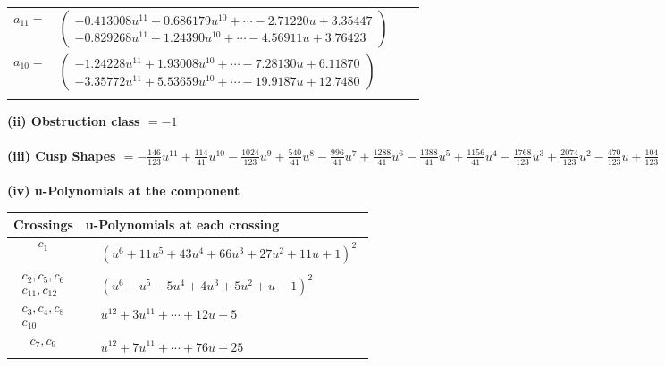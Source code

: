 \documentclass[1p]{elsarticle_modified}
\theoremstyle{definition}
\begin{document}
\begin{tabular}{m{7pt} m{180pt} m{7pt} m{180pt} }
\flushright $a_{11}=$&$\begin{pmatrix}-0.413008 u^{11}+0.686179 u^{10}+\cdots-2.71220 u+3.35447\\-0.829268 u^{11}+1.24390 u^{10}+\cdots-4.56911 u+3.76423\end{pmatrix}$ \\
\flushright $a_{10}=$&$\begin{pmatrix}-1.24228 u^{11}+1.93008 u^{10}+\cdots-7.28130 u+6.11870\\-3.35772 u^{11}+5.53659 u^{10}+\cdots-19.9187 u+12.7480\end{pmatrix}$\\&\end{tabular}
\flushleft \textbf{(ii) Obstruction class $= -1$}\\~\\
\flushleft \textbf{(iii) Cusp Shapes $= -\frac{146}{123} u^{11}+\frac{114}{41} u^{10}-\frac{1024}{123} u^9+\frac{540}{41} u^8-\frac{996}{41} u^7+\frac{1288}{41} u^6-\frac{1388}{41} u^5+\frac{1156}{41} u^4-\frac{1768}{123} u^3+\frac{2074}{123} u^2-\frac{470}{123} u+\frac{104}{123}$}\\~\\
\newpage\renewcommand{\arraystretch}{1}
\flushleft \textbf{(iv) u-Polynomials at the component}\newline \\
\begin{tabular}{m{50pt}|m{274pt}}
Crossings & \hspace{64pt}u-Polynomials at each crossing \\
\hline $$\begin{aligned}c_{1}\end{aligned}$$&$\begin{aligned}
&(u^6+11 u^5+43 u^4+66 u^3+27 u^2+11 u+1)^2
\end{aligned}$\\
\hline $$\begin{aligned}c_{2},c_{5},c_{6}\\c_{11},c_{12}\end{aligned}$$&$\begin{aligned}
&(u^6- u^5-5 u^4+4 u^3+5 u^2+u-1)^2
\end{aligned}$\\
\hline $$\begin{aligned}c_{3},c_{4},c_{8}\\c_{10}\end{aligned}$$&$\begin{aligned}
&u^{12}+3 u^{11}+\cdots+12 u+5
\end{aligned}$\\
\hline $$\begin{aligned}c_{7},c_{9}\end{aligned}$$&$\begin{aligned}
&u^{12}+7 u^{11}+\cdots+76 u+25
\end{aligned}$\\
\hline
\end{tabular}\\~\\
\end{document}

